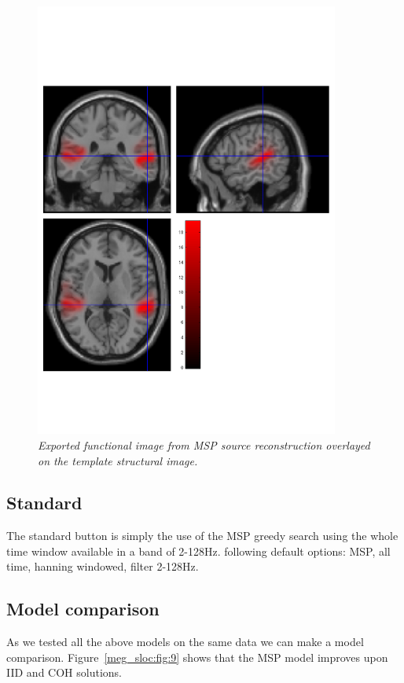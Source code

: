 \begin{figure}
\begin{center}
\includegraphics[width=100mm]{meg_sloc/slide8}
\caption{\em Exported functional image from MSP source reconstruction overlayed on the template structural image.\label{meg_sloc:fig:8}}
\end{center}
\end{figure}

\subsection{Standard}
The standard button is simply the use of the MSP greedy search using the whole time window available in a band of 2-128Hz. following default options: MSP, all time, hanning windowed, filter 2-128Hz.

\subsection{Model comparison}
As we tested all the above models on the same data we can make a model comparison. Figure~\ref{meg_sloc:fig:9} shows that the MSP model improves upon IID and COH solutions.

